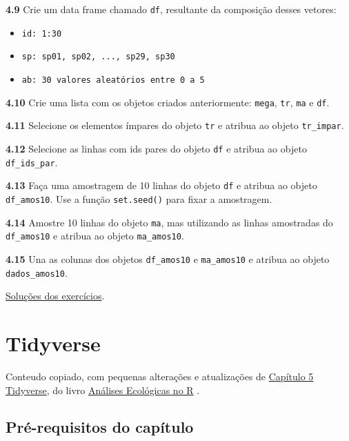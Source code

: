 \documentclass[
]{article}
\providecommand{\tightlist}{%
  \setlength{\itemsep}{0pt}\setlength{\parskip}{0pt}}
\begin{document}
\textbf{4.9}
Crie um data frame chamado \texttt{df}, resultante da composição desses vetores:

\begin{itemize}
\tightlist
\item
  \texttt{id:\ 1:30}
\item
  \texttt{sp:\ sp01,\ sp02,\ ...,\ sp29,\ sp30}
\item
  \texttt{ab:\ 30\ valores\ aleatórios\ entre\ 0\ a\ 5}
\end{itemize}

\textbf{4.10}
Crie uma lista com os objetos criados anteriormente: \texttt{mega}, \texttt{tr}, \texttt{ma} e \texttt{df}.

\textbf{4.11}
Selecione os elementos ímpares do objeto \texttt{tr} e atribua ao objeto \texttt{tr\_impar}.

\textbf{4.12}
Selecione as linhas com ids pares do objeto \texttt{df} e atribua ao objeto \texttt{df\_ids\_par}.

\textbf{4.13}
Faça uma amostragem de 10 linhas do objeto \texttt{df} e atribua ao objeto \texttt{df\_amos10}. Use a função \texttt{set.seed()} para fixar a amostragem.

\textbf{4.14}
Amostre 10 linhas do objeto \texttt{ma}, mas utilizando as linhas amostradas do \texttt{df\_amos10} e atribua ao objeto \texttt{ma\_amos10}.

\textbf{4.15}
Una as colunas dos objetos \texttt{df\_amos10} e \texttt{ma\_amos10} e atribua ao objeto \texttt{dados\_amos10}.

\href{https://exercicios-livro-aer.netlify.app/cap.-4---introdu\%C3\%A7\%C3\%A3o-ao-r.html}{Soluções dos exercícios}.

\newpage{}

\hypertarget{cap22}{%
\section{Tidyverse}\label{cap22}}

Conteudo copiado, com pequenas alterações e atualizações de \href{https://analises-ecologicas.com/cap5}{Capítulo 5 Tidyverse}, do livro \href{https://analises-ecologicas.com/}{Análises Ecológicas no R} .

\hypertarget{pruxe9-requisitos-do-capuxedtulo-1}{%
\subsection*{Pré-requisitos do capítulo}\label{pruxe9-requisitos-do-capuxedtulo-1}}
\end{document}
